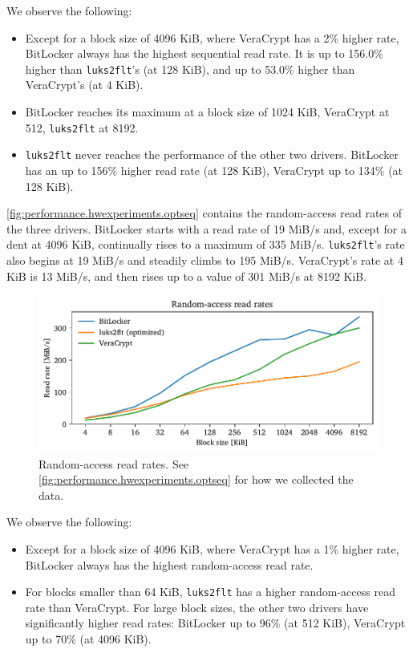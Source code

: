 We observe the following:
\begin{itemize}
	\item Except for a block size of 4096 KiB, where VeraCrypt has a 2\% higher rate, BitLocker always has the highest sequential read rate. It is up to 156.0\% higher than \texttt{luks2flt}'s (at 128 KiB), and up to 53.0\% higher than VeraCrypt's (at 4 KiB).
	\item BitLocker reaches its maximum at a block size of 1024 KiB, VeraCrypt at 512, \texttt{luks2flt} at 8192.
	\item \texttt{luks2flt} never reaches the performance of the other two drivers. BitLocker has an up to 156\% higher read rate (at 128 KiB), VeraCrypt up to 134\% (at 128 KiB).
\end{itemize}

\autoref{fig:performance.hwexperiments.optseq} contains the random-access read rates of the three drivers. BitLocker starts with a read rate of 19 MiB/s and, except for a dent at 4096 KiB, continually rises to a maximum of 335 MiB/s. \texttt{luks2flt}'s rate also begins at 19 MiB/s and steadily climbs to 195 MiB/s. VeraCrypt's rate at 4 KiB is 13 MiB/s, and then rises up to a value of 301 MiB/s at 8192 KiB. 

\begin{figure}[htb!]
	\center
	\includegraphics[scale=1]{../fig/performance.hwexperiments.optrand.pdf}
	\caption[
		Random-access read rates
	]{
		Random-access read rates. See \autoref{fig:performance.hwexperiments.optseq} for how we collected the data.
	}
	\label{fig:performance.hwexperiments.optrand}
\end{figure}

We observe the following:
\begin{itemize}
	\item Except for a block size of 4096 KiB, where VeraCrypt has a 1\% higher rate, BitLocker always has the highest random-access read rate.
	\item For blocks smaller than 64 KiB, \texttt{luks2flt} has a higher random-access read rate than VeraCrypt. For large block sizes, the other two drivers have significantly higher read rates: BitLocker up to 96\% (at 512 KiB), VeraCrypt up to 70\% (at 4096 KiB).
\end{itemize}


